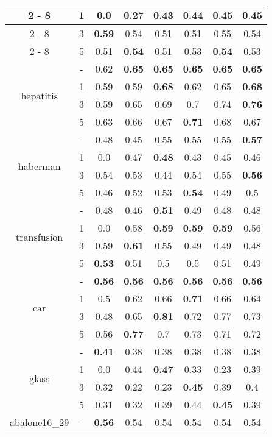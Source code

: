 \documentclass{article}%
\begin{document}
\begin{longtable}{c|c|cccccc}
\cline{2%
-%
8}%
&1&0.0&0.27&0.43&0.44&\textbf{0.45}&\textbf{0.45}\\%
\cline{2%
-%
8}%
&3&\textbf{0.59}&0.54&0.51&0.51&0.55&0.54\\%
\cline{2%
-%
8}%
&5&0.51&\textbf{0.54}&0.51&0.53&\textbf{0.54}&0.53\\%
\hline%
\multirow{4}{*}{hepatitis}&{-}&0.62&\textbf{0.65}&\textbf{0.65}&\textbf{0.65}&\textbf{0.65}&\textbf{0.65}\\%
\cline{2%
-%
8}%
&1&0.59&0.59&\textbf{0.68}&0.62&0.65&\textbf{0.68}\\%
\cline{2%
-%
8}%
&3&0.59&0.65&0.69&0.7&0.74&\textbf{0.76}\\%
\cline{2%
-%
8}%
&5&0.63&0.66&0.67&\textbf{0.71}&0.68&0.67\\%
\hline%
\multirow{4}{*}{haberman}&{-}&0.48&0.45&0.55&0.55&0.55&\textbf{0.57}\\%
\cline{2%
-%
8}%
&1&0.0&0.47&\textbf{0.48}&0.43&0.45&0.46\\%
\cline{2%
-%
8}%
&3&0.54&0.53&0.44&0.54&0.55&\textbf{0.56}\\%
\cline{2%
-%
8}%
&5&0.46&0.52&0.53&\textbf{0.54}&0.49&0.5\\%
\hline%
\multirow{4}{*}{transfusion}&{-}&0.48&0.46&\textbf{0.51}&0.49&0.48&0.48\\%
\cline{2%
-%
8}%
&1&0.0&0.58&\textbf{0.59}&\textbf{0.59}&\textbf{0.59}&0.56\\%
\cline{2%
-%
8}%
&3&0.59&\textbf{0.61}&0.55&0.49&0.49&0.48\\%
\cline{2%
-%
8}%
&5&\textbf{0.53}&0.51&0.5&0.5&0.51&0.49\\%
\hline%
\multirow{4}{*}{car}&{-}&\textbf{0.56}&\textbf{0.56}&\textbf{0.56}&\textbf{0.56}&\textbf{0.56}&\textbf{0.56}\\%
\cline{2%
-%
8}%
&1&0.5&0.62&0.66&\textbf{0.71}&0.66&0.64\\%
\cline{2%
-%
8}%
&3&0.48&0.65&\textbf{0.81}&0.72&0.77&0.73\\%
\cline{2%
-%
8}%
&5&0.56&\textbf{0.77}&0.7&0.73&0.71&0.72\\%
\hline%
\multirow{4}{*}{glass}&{-}&\textbf{0.41}&0.38&0.38&0.38&0.38&0.38\\%
\cline{2%
-%
8}%
&1&0.0&0.44&\textbf{0.47}&0.33&0.23&0.39\\%
\cline{2%
-%
8}%
&3&0.32&0.22&0.23&\textbf{0.45}&0.39&0.4\\%
\cline{2%
-%
8}%
&5&0.31&0.32&0.39&0.44&\textbf{0.45}&0.39\\%
\hline%
\multirow{4}{*}{abalone16\_29}&{-}&\textbf{0.56}&0.54&0.54&0.54&0.54&0.54\\%

\end{longtable}
\end{document}

